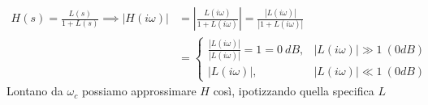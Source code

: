 \begin{equation*}
	\begin{aligned}
		H(s) =\frac{L(s)}{1+L(s)} \implies | H(i\omega)|  & =\left| \frac{L(i\omega)}{1+L(i\omega)}\right| =\frac{| L(i\omega)| }{| 1+L(i\omega)| } \\
		                                                     & =\begin{cases}                                                                          
		\frac{| L(i\omega)| }{| L(i\omega)| } =1=0\ \si{dB}, & | L(i\omega)| \gg 1\ (0 \si{dB})                                                        \\
		| L(i\omega)| ,                                      & | L(i\omega)| \ll 1\ (0 \si{dB})                                                        
		\end{cases}
	\end{aligned}
\end{equation*}
Lontano da $\omega _c$ possiamo approssimare $H$ così, ipotizzando quella specifica $L$

